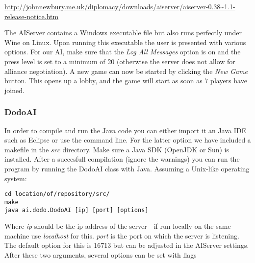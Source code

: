 \documentclass[a4paper]{article} %
\begin{document}
\begin{sloppypar}
\noindent\url{http://johnnewbury.me.uk/diplomacy/downloads/aiserver/aiserver-0.38~1.1-release-notice.htm}
\end{sloppypar}

The AIServer contains a Windows executable file but also runs perfectly under Wine on Linux. Upon running this executable the user is presented with various options. For our AI, make sure that the \textit{Log All Messages} option is on and the press level is set to a minimum of 20 (otherwise the server does not allow for alliance negotiation). A new game can now be started by clicking the \textit{New Game} button. This opens up a lobby, and the game will start as soon as 7 players have joined.     

\subsubsection{DodoAI}
In order to compile and run the Java code you can either import it an Java IDE such as Eclipse or use the command line. For the latter option we have included a makefile in the $src$ directory. Make sure a Java SDK (OpenJDK or Sun) is installed. After a succesfull compilation (ignore the warnings) you can run the program by running the DodoAI class with Java. Assuming a Unix-like operating system:       
\begin{lstlisting}[frame=single] 
cd location/of/repository/src/
make
java ai.dodo.DodoAI [ip] [port] [options]
\end{lstlisting}

Where \textit{ip} should be the ip address of the server - if run locally on the same machine use \textit{localhost} for this. \textit{port} is the port on which the server is listening. The default option for this is 16713 but can be adjusted in the AIServer settings. After these two arguments, several options can be set with flags
\end{document}
